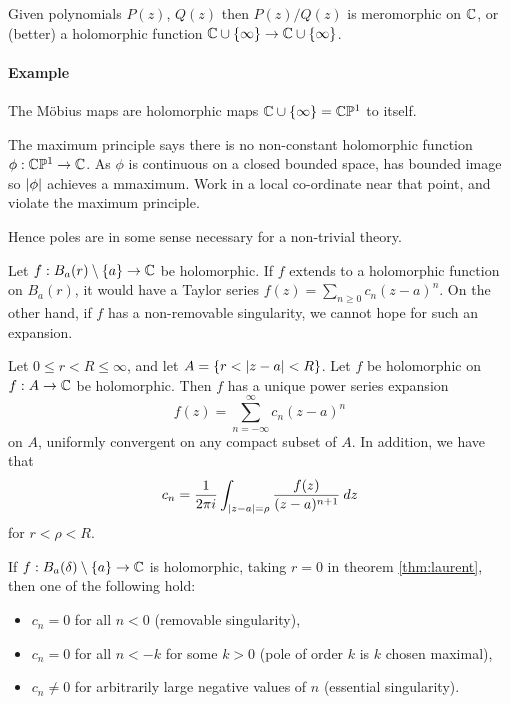 Given polynomials $P(z)$, $Q(z)$ then $P(z)/Q(z)$ is meromorphic on $\mathbb{C}$, or (better) a holomorphic function $\mathbb{C} \cup \{ \infty \} \rightarrow \mathbb{C} \cup \{ \infty \}$.

\paragraph{Example}

The Möbius maps are holomorphic maps $\mathbb{C} \cup \{ \infty \} = \mathbb{C}\mathbb{P}^1$ to itself.

\begin{remark}
  The maximum principle says there is no non-constant holomorphic function $\phi : \mathbb{C}\mathbb{P}^1 \rightarrow \mathbb{C}$.
As $\phi$ is continuous on a closed bounded space, has bounded image so $\lvert\phi\rvert$ achieves a mmaximum. Work in a local co-ordinate near that point, and violate the maximum principle.

Hence poles are in some sense necessary for a non-trivial theory.
\end{remark}

Let $f : B_a(r) \setminus \{ a \} \rightarrow \mathbb{C}$ be holomorphic. If $f$ extends to a holomorphic function on $B_a(r)$, it would have a Taylor series $f(z) = \sum_{n \geq 0} c_n(z - a)^n$.
On the other hand, if $f$ has a non-removable singularity, we cannot hope for such an expansion.

\begin{theorem}[name=Laurent's theorem,label=thm:laurent]
  Let $0 \leq r < R \leq \infty$, and let $A = \{ r < \lvert z - a\rvert < R \}$. Let $f$ be holomorphic on $f : A \rightarrow \mathbb{C}$ be holomorphic. Then $f$ has a unique power series expansion
\[
f(z) = \sum_{n = -\infty}^{\infty} c_n(z - a)^n
\]
on $A$, uniformly convergent on any compact subset of $A$.
In addition, we have that
\[
c_n = \frac{1}{2 \pi i} \int_{\lvert z - a\rvert = \rho} \frac{f(z)}{(z-a)^{n+1}} \: dz
\]
for $r < \rho < R$.
\end{theorem}

\begin{remark}
  If $f : B_a(\delta) \setminus \{ a \} \rightarrow \mathbb{C}$ is holomorphic, taking $r = 0$ in theorem \ref{thm:laurent}, then one of the following hold:
  \begin{itemize}
    \item $c_n = 0$ for all $n < 0$ (removable singularity),
    \item $c_n = 0$ for all $n < -k$ for some $k > 0$ (pole of order $k$ is $k$ chosen maximal),
    \item $c_n \neq 0$ for arbitrarily large negative values of $n$ (essential singularity).
  \end{itemize}
\end{remark}

